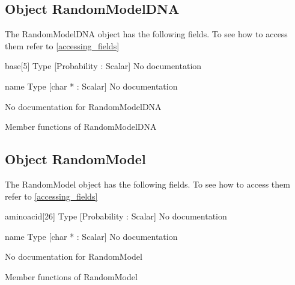 \subsection{Object RandomModelDNA}

\label{object_RandomModelDNA}

The RandomModelDNA object has the following fields. To see how to access them refer to \ref{accessing_fields}
\begin{description}
\item{base[5]} Type [Probability : Scalar] No documentation

\item{name} Type [char * : Scalar] No documentation

\end{description}
No documentation for RandomModelDNA

Member functions of RandomModelDNA

\subsection{Object RandomModel}

\label{object_RandomModel}

The RandomModel object has the following fields. To see how to access them refer to \ref{accessing_fields}
\begin{description}
\item{aminoacid[26]} Type [Probability : Scalar] No documentation

\item{name} Type [char * : Scalar] No documentation

\end{description}
No documentation for RandomModel

Member functions of RandomModel


